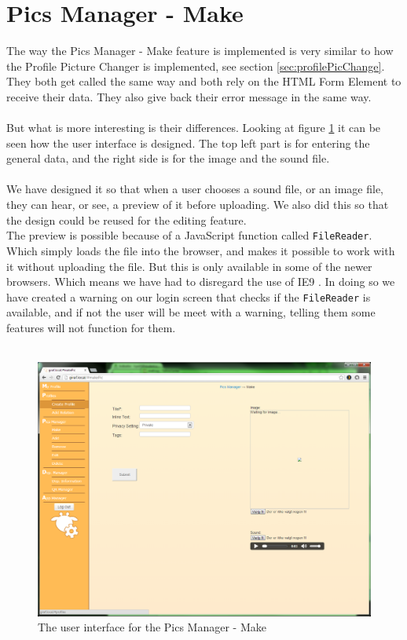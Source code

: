 \section{Pics Manager - Make}
The way the Pics Manager - Make feature is implemented is very similar to how the Profile Picture Changer is implemented, see section \ref{sec:profilePicChange}.\\
They both get called the same way and both rely on the HTML Form Element to receive their data. They also give back their error message in the same way.\\
\\
But what is more interesting is their differences. Looking at figure \ref{fig:picsManagerMake} it can be seen how the user interface is designed. The top left part is for entering the general data, and the right side is for the image and the sound file.\\
\\
We have designed it so that when a user chooses a sound file, or an image file, they can hear, or see, a preview of it before uploading. We also did this so that the design could be reused for the editing feature.\\
The preview is possible because of a JavaScript function called \texttt{FileReader}. Which simply loads the file into the browser, and makes it possible to work with it without uploading the file. But this is only available in some of the newer browsers. Which means we have had to disregard the use of IE9 \citep{canIUse}. In doing so we have created a warning on our login screen that checks if the \texttt{FileReader} is available, and if not the user will be meet with a warning, telling them some features will not function for them.\\
\\
\begin{figure}[htbp]
	\centering
		\includegraphics[width=1\textwidth]{images/picsManagerMake.png}
	\caption{The user interface for the Pics Manager - Make}
	\label{fig:picsManagerMake}
\end{figure}

